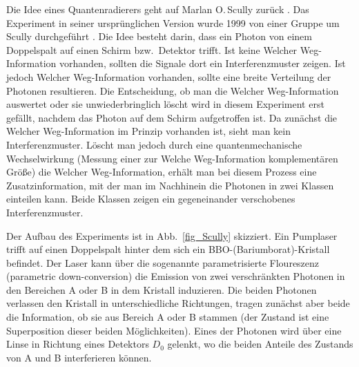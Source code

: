Die Idee eines Quantenradierers geht auf Marlan O.\,Scully zur\"uck \cite{Scully}.
Das Experiment in seiner urspr\"unglichen Version wurde 1999 von einer Gruppe um Scully
durchgef\"uhrt \cite{Kim}. Die Idee besteht darin, dass ein Photon von einem Doppelspalt
auf einen Schirm bzw.\ Detektor trifft. Ist keine \glqq Welcher Weg\grqq-Information vorhanden,
sollten die Signale dort ein Interferenzmuster zeigen. Ist jedoch \glqq Welcher Weg\grqq-Information
vorhanden, sollte eine breite Verteilung der Photonen resultieren. Die Entscheidung, ob man
die \glqq Welcher Weg\grqq-Information auswertet oder sie unwiederbringlich l\"oscht wird
in diesem Experiment erst gef\"allt, nachdem das Photon auf dem Schirm aufgetroffen ist. 
Da zun\"achst die \glqq Welcher Weg\grqq-Information im Prinzip vorhanden ist, sieht man
kein Interferenzmuster. L\"oscht man jedoch durch eine quantenmechanische
Wechselwirkung (Messung einer zur \glqq Welche Weg\grqq-Information komplement\"aren
Gr\"o\ss e) die \glqq Welcher Weg\grqq-Information,
erh\"alt man bei diesem Prozess eine Zusatzinformation, mit der man im Nachhinein die
Photonen in zwei Klassen einteilen kann. Beide Klassen zeigen ein gegeneinander
verschobenes Interferenzmuster. 

Der Aufbau des Experiments ist in Abb.\ \ref{fig_Scully} skizziert. Ein Pumplaser trifft auf einen
Doppelspalt hinter dem sich ein BBO-(Bariumborat)-Kristall befindet. Der Laser kann
\"uber die sogenannte parametrisierte Floureszenz (parametric down-conversion) die Emission
von zwei verschr\"ankten Photonen in den Bereichen A oder B in dem Kristall induzieren. 
Die beiden Photonen verlassen den Kristall in unterschiedliche Richtungen, tragen zun\"achst
aber beide die Information, ob sie aus Bereich A oder B stammen (der Zustand ist eine
Superposition dieser beiden M\"oglichkeiten). Eines der Photonen wird \"uber eine Linse
in Richtung eines Detektors $D_0$ gelenkt, wo die beiden Anteile des Zustands von A und B interferieren
k\"onnen. 

